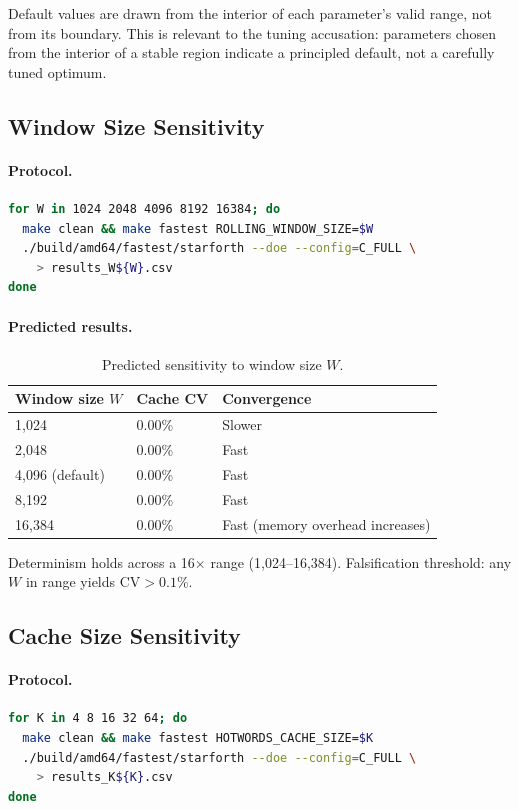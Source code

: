Default values are drawn from the interior of each parameter's valid range, not
from its boundary. This is relevant to the tuning accusation: parameters chosen
from the interior of a stable region indicate a principled default, not
a carefully tuned optimum.

\subsection{Window Size Sensitivity}

\paragraph{Protocol.}
\begin{lstlisting}[language=bash]
for W in 1024 2048 4096 8192 16384; do
  make clean && make fastest ROLLING_WINDOW_SIZE=$W
  ./build/amd64/fastest/starforth --doe --config=C_FULL \
    > results_W${W}.csv
done
\end{lstlisting}

\paragraph{Predicted results.}
\begin{table}[h]
\centering
\caption{Predicted sensitivity to window size $W$.}
\begin{tabular}{lll}
\toprule
\textbf{Window size $W$} & \textbf{Cache CV} & \textbf{Convergence} \\
\midrule
1{,}024 & 0.00\% & Slower \\
2{,}048 & 0.00\% & Fast \\
4{,}096 (default) & 0.00\% & Fast \\
8{,}192 & 0.00\% & Fast \\
16{,}384 & 0.00\% & Fast (memory overhead increases) \\
\bottomrule
\end{tabular}
\end{table}

Determinism holds across a 16$\times$ range (1{,}024--16{,}384). Falsification
threshold: any $W$ in range yields $\text{CV} > 0.1\%$.

\subsection{Cache Size Sensitivity}

\paragraph{Protocol.}
\begin{lstlisting}[language=bash]
for K in 4 8 16 32 64; do
  make clean && make fastest HOTWORDS_CACHE_SIZE=$K
  ./build/amd64/fastest/starforth --doe --config=C_FULL \
    > results_K${K}.csv
done
\end{lstlisting}


